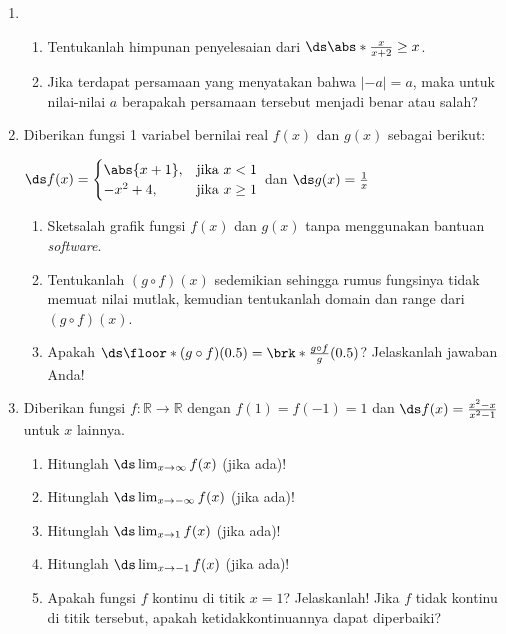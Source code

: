 \begin{enumerate}[leftmargin=*, label={\arabic*}.]
\item 
\begin{enumerate}[label={\alph*}.]
    \item Tentukanlah himpunan penyelesaian dari 
    $\ds \abs*{\frac{x}{x+2}} \geq x$.
    \item Jika terdapat persamaan yang menyatakan bahwa $|-a| = a$, 
    maka untuk nilai-nilai $a$ berapakah persamaan tersebut menjadi 
    benar atau salah?
\end{enumerate}
\item Diberikan fungsi 1 variabel bernilai real $f(x)$ dan $g(x)$ sebagai berikut:
\begin{center}
    $\ds f(x) = 
    \begin{cases}
        \abs{x+1}, &\text{jika $x < 1$}\\
        -x^{2}+4, &\text{jika $x \geq 1$}
    \end{cases}$ dan $\ds g(x) = \frac{1}{x}$
\end{center}
\begin{enumerate}[label={\alph*}.]
    \item Sketsalah grafik fungsi $f(x)$ dan $g(x)$ tanpa menggunakan bantuan
    \textit{software}.    
    \item Tentukanlah $(g \circ f)(x)$ sedemikian sehingga rumus fungsinya tidak 
    memuat nilai mutlak, kemudian tentukanlah domain dan range dari $(g \circ f)(x)$.
    \item Apakah 
    $\ds \floor*{(g \circ f)(0.5)} = \brk*{\frac{g \circ f}{g}}(0.5)$? 
    Jelaskanlah jawaban Anda!
\end{enumerate}
\item Diberikan fungsi $f\colon \mathbb{R} \to \mathbb{R}$ dengan $f(1)=f(-1)=1$ 
dan $\ds f(x) = \frac{x^{2}-x}{x^{2}-1}$ untuk $x$ lainnya.
\begin{enumerate}[label={\alph*}.]
    \item Hitunglah $\ds \lim_{x \to \infty} f(x)$ (jika ada)! 
    \item Hitunglah $\ds \lim_{x \to -\infty} f(x)$ (jika ada)! 
    \item Hitunglah $\ds \lim_{x \to 1} f(x)$ (jika ada)! 
    \item Hitunglah $\ds \lim_{x \to -1} f(x)$ (jika ada)!
    \item Apakah fungsi $f$ kontinu di titik $x=1$? Jelaskanlah! Jika $f$ tidak 
    kontinu di titik tersebut, apakah ketidakkontinuannya dapat diperbaiki? 

\end{enumerate}
\end{enumerate}
